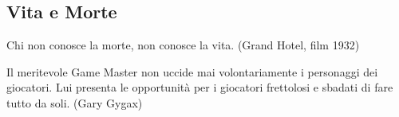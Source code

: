\pagebreak

\subsection{Vita e Morte}\label{morire}

\begin{changemargin}{0.3cm}{0.3cm}\begin{enfasi}{Chi non conosce la morte, non conosce la vita. (Grand Hotel, film 1932)

\medskip

Il meritevole Game Master non uccide mai volontariamente i personaggi dei giocatori. Lui presenta le opportunità per i giocatori frettolosi e sbadati di fare tutto da soli. (Gary Gygax)}\end{enfasi}\end{changemargin}\medskip

